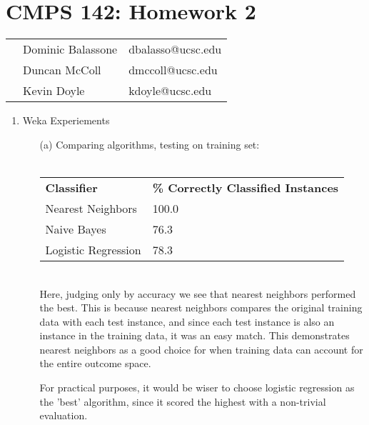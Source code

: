 \documentclass[12pt]{article}
\begin{document}
\section*{CMPS 142: Homework 2}

\begin{tabular}{p{8cm} l l}
    & Dominic Balassone & dbalasso@ucsc.edu \\
    & Duncan McColl & dmccoll@ucsc.edu\\
    & Kevin Doyle 	& kdoyle@ucsc.edu \\
\end{tabular}
    
\begin{enumerate}
  \item Weka Experiements
  
  \begin{enumerate}
  	\item[(a)] Comparing algorithms, testing on training set: \\ \\
  		\begin{tabular}{l l}
  			\textbf{Classifier} & \textbf{\% Correctly Classified Instances} \\
  			Nearest Neighbors & 100.0 \\
  			Naive Bayes & 76.3 \\
  			Logistic Regression & 78.3
  	
  		\end{tabular} \\
  		
  		Here, judging only by accuracy we see that nearest neighbors performed the best. This is because nearest neighbors compares the original training data with each test instance, and since each test instance is also an instance in the training data, it was an easy match. This demonstrates nearest neighbors as a good choice for when training data can account for the entire outcome space. 
  		
  		For practical purposes, it would be wiser to choose logistic regression as the 'best' algorithm, since it scored the highest with a non-trivial evaluation.
  		

\end{enumerate}
\end{enumerate}
\end{document}
